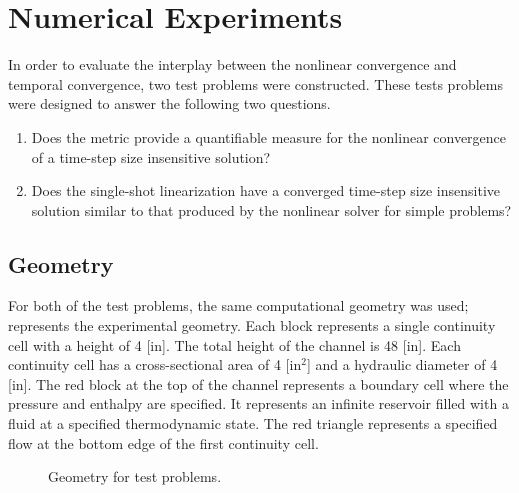 \section{Numerical Experiments}
\label{sect:numerical_experiments}

In order to evaluate the interplay between the nonlinear convergence and temporal convergence, two test problems were constructed.
These tests problems were designed to answer the following two questions.

\begin{enumerate}
\item{Does the metric provide a quantifiable measure for the nonlinear convergence of a time-step size insensitive solution?}
\item{Does the single-shot linearization have a converged time-step size insensitive solution similar to that produced by the nonlinear solver for simple problems?}
\end{enumerate}

\subsection{Geometry}
\label{subsect:experimental_geometry}
For both of the test problems, the same computational geometry was used;   represents the experimental geometry.
Each block represents a single continuity cell with a height of 4 [in].
The total height of the channel is 48 [in].
Each continuity cell has a cross-sectional area of 4 [in$^2$] and a hydraulic diameter of 4 [in].
The red block at the top of the channel represents a boundary cell where the pressure and enthalpy are specified.
It represents an infinite reservoir filled with a fluid at a specified thermodynamic state.
The red triangle represents a specified flow at the bottom edge of the first continuity cell. 

\begin{figure}[h!t]
\begin{center}
\end{center}
\caption{Geometry for test problems.}
\label{fig:exp_geometry}
\end{figure}

